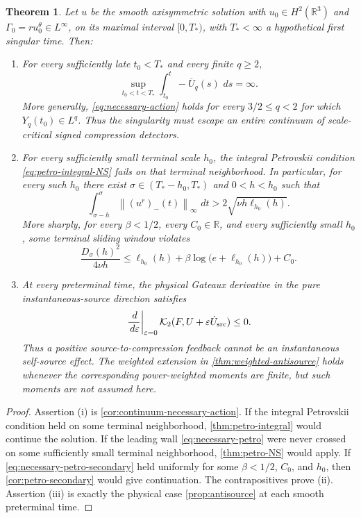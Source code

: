 \documentclass[11pt]{article}
\numberwithin{equation}{section}
\newtheorem{theorem}{Theorem}[section]
\theoremstyle{definition}
\newcommand{\R}{\mathbb R}
\newcommand{\dd}{\,d}
\newcommand{\norm}[1]{\left\lVert #1\right\rVert}
\begin{document}
\begin{theorem}\label{thm:phenotype}
Let $u$ be the smooth axisymmetric solution with $u_0\in H^2(\R^3)$ and $\Gamma_0=ru_0^\theta\in L^\infty$, on its maximal interval $[0,T_*)$, with $T_*<\infty$ a hypothetical first singular time.  Then:
\begin{enumerate}[label=\rm(\roman*)]
\item For every sufficiently late $t_0<T_*$ and every finite $q\ge2$,
\begin{equation}\label{eq:necessary-action}
 \sup_{t_0<t<T_*}\int_{t_0}^t-\overline U_q(s)\,\dd s=\infty.
\end{equation}
More generally, \eqref{eq:necessary-action} holds for every $3/2\le q<2$ for which $Y_q(t_0)\in L^q$.  Thus the singularity must escape an entire continuum of scale-critical signed compression detectors.

\item For every sufficiently small terminal scale $h_0$, the integral Petrovskii condition \eqref{eq:petro-integral-NS} fails on that terminal neighborhood.  In particular, for every such $h_0$ there exist $\sigma\in(T_*-h_0,T_*)$ and $0<h<h_0$ such that
\begin{equation}\label{eq:necessary-petro}
 \int_{\sigma-h}^{\sigma}\norm{(u^r)_-(t)}_\infty\,\dd t
 >2\sqrt{\nu h\ell_{h_0}(h)}.
\end{equation}
More sharply, for every $\beta<1/2$, every $C_0\in\R$, and every sufficiently small $h_0$, some terminal sliding window violates
\begin{equation}\label{eq:necessary-petro-secondary}
 \frac{D_\sigma(h)^2}{4\nu h}
 \le
 \ell_{h_0}(h)
 +\beta\log\!\bigl(e+\ell_{h_0}(h)\bigr)+C_0.
\end{equation}

\item At every preterminal time, the physical Gateaux derivative in the pure instantaneous-source direction satisfies
\[
 \left.\frac{\dd}{\dd\varepsilon}\right|_{\varepsilon=0}
 \mathcal K_2(F,U+\varepsilon\dot U_{\rm src})\le0.
\]
Thus a positive source-to-compression feedback cannot be an instantaneous self-source effect.  The weighted extension in \cref{thm:weighted-antisource} holds whenever the corresponding power-weighted moments are finite, but such moments are not assumed here.
\end{enumerate}
\end{theorem}

\begin{proof}
Assertion (i) is \cref{cor:continuum-necessary-action}.  If the integral Petrovskii condition held on some terminal neighborhood, \cref{thm:petro-integral} would continue the solution.  If the leading wall \eqref{eq:necessary-petro} were never crossed on some sufficiently small terminal neighborhood, \cref{thm:petro-NS} would apply.  If \eqref{eq:necessary-petro-secondary} held uniformly for some $\beta<1/2$, $C_0$, and $h_0$, then \cref{cor:petro-secondary} would give continuation.  The contrapositives prove (ii).  Assertion (iii) is exactly the physical case \cref{prop:antisource} at each smooth preterminal time.
\end{proof}
\end{document}
